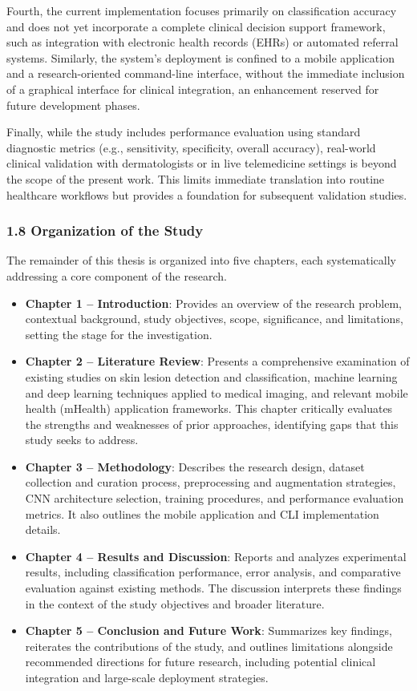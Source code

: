 \documentclass[
  12pt,
  oneside]{article}
\providecommand{\tightlist}{%
  \setlength{\itemsep}{0pt}\setlength{\parskip}{0pt}}
\begin{document}
Fourth, the current implementation focuses primarily on classification
accuracy and does not yet incorporate a complete clinical decision
support framework, such as integration with electronic health records
(EHRs) or automated referral systems. Similarly, the system's deployment
is confined to a mobile application and a research-oriented command-line
interface, without the immediate inclusion of a graphical interface for
clinical integration, an enhancement reserved for future development
phases.

Finally, while the study includes performance evaluation using standard
diagnostic metrics (e.g., sensitivity, specificity, overall accuracy),
real-world clinical validation with dermatologists or in live
telemedicine settings is beyond the scope of the present work. This
limits immediate translation into routine healthcare workflows but
provides a foundation for subsequent validation studies.

\subsubsection{1.8 Organization of the
Study}\label{organization-of-the-study}

The remainder of this thesis is organized into five chapters, each
systematically addressing a core component of the research.

\begin{itemize}
\tightlist
\item
  \textbf{Chapter 1 -- Introduction}: Provides an overview of the
  research problem, contextual background, study objectives, scope,
  significance, and limitations, setting the stage for the
  investigation.
\item
  \textbf{Chapter 2 -- Literature Review}: Presents a comprehensive
  examination of existing studies on skin lesion detection and
  classification, machine learning and deep learning techniques applied
  to medical imaging, and relevant mobile health (mHealth) application
  frameworks. This chapter critically evaluates the strengths and
  weaknesses of prior approaches, identifying gaps that this study seeks
  to address.
\item
  \textbf{Chapter 3 -- Methodology}: Describes the research design,
  dataset collection and curation process, preprocessing and
  augmentation strategies, CNN architecture selection, training
  procedures, and performance evaluation metrics. It also outlines the
  mobile application and CLI implementation details.
\item
  \textbf{Chapter 4 -- Results and Discussion}: Reports and analyzes
  experimental results, including classification performance, error
  analysis, and comparative evaluation against existing methods. The
  discussion interprets these findings in the context of the study
  objectives and broader literature.
\item
  \textbf{Chapter 5 -- Conclusion and Future Work}: Summarizes key
  findings, reiterates the contributions of the study, and outlines
  limitations alongside recommended directions for future research,
  including potential clinical integration and large-scale deployment
  strategies.
\end{itemize}
\end{document}
